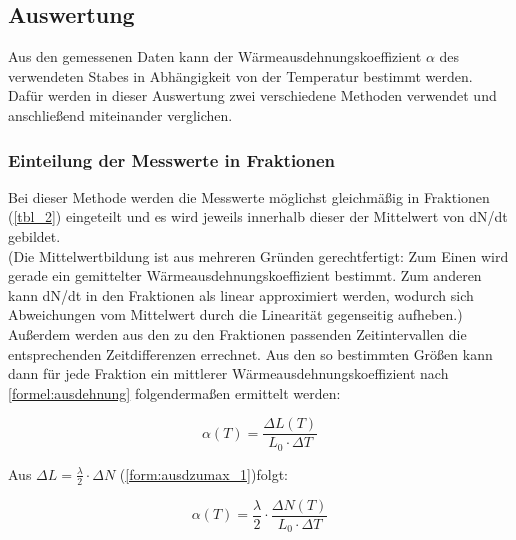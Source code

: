 \subsection{Auswertung}
Aus den gemessenen Daten kann der Wärmeausdehnungskoeffizient $ \alpha $ des verwendeten Stabes in Abhängigkeit von der Temperatur bestimmt werden. Dafür werden in dieser Auswertung zwei verschiedene Methoden verwendet und anschließend miteinander verglichen.

\subsubsection{Einteilung der Messwerte in Fraktionen}
Bei dieser Methode werden die Messwerte möglichst gleichmäßig in Fraktionen (\ref{tbl_2}) eingeteilt und es wird jeweils innerhalb dieser der Mittelwert von dN/dt gebildet.\\(Die Mittelwertbildung ist aus mehreren Gründen gerechtfertigt: Zum Einen wird gerade ein gemittelter Wärmeausdehnungskoeffizient bestimmt. Zum anderen kann dN/dt in den Fraktionen als linear approximiert werden, wodurch sich Abweichungen vom Mittelwert durch die Linearität gegenseitig aufheben.) Außerdem werden aus den zu den Fraktionen passenden Zeitintervallen die entsprechenden Zeitdifferenzen errechnet. Aus den so bestimmten Größen kann dann für jede Fraktion ein mittlerer Wärmeausdehnungskoeffizient nach \ref{formel:ausdehnung} folgendermaßen ermittelt werden:

\begin{equation}
\alpha(T)=\frac{\Delta L(T)}{L_{0} \cdot \Delta T}
\end{equation}

Aus $ \Delta L = \frac{\lambda}{2} \cdot \Delta N $ (\ref{form:ausdzumax_1})folgt:

\begin{equation}
\alpha (T)= \frac{\lambda}{2} \cdot \frac{\Delta N(T)}{L_0 \cdot \Delta T}
\end{equation}

